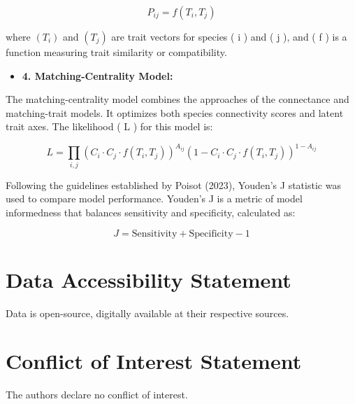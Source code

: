 \documentclass[
]{agujournal2019}
\providecommand{\tightlist}{%
  \setlength{\itemsep}{0pt}\setlength{\parskip}{0pt}}\usepackage{longtable,booktabs,array}
\begin{document}
\[
P_{ij} = f(T_i, T_j)
\]

where \(( T_i)\) and \(( T_j)\) are trait vectors for species ( i ) and
( j ), and ( f ) is a function measuring trait similarity or
compatibility.

\begin{itemize}
\tightlist
\item
  \textbf{4. Matching-Centrality Model:}
\end{itemize}

The matching-centrality model combines the approaches of the connectance
and matching-trait models. It optimizes both species connectivity scores
and latent trait axes. The likelihood ( L ) for this model is:

\[
L = \prod_{i,j} \left( C_i \cdot C_j \cdot f(T_i, T_j) \right)^{A_{ij}} \left( 1 - C_i \cdot C_j \cdot f(T_i, T_j) \right)^{1 - A_{ij}}
\]

Following the guidelines established by Poisot (2023), Youden's J
statistic was used to compare model performance. Youden's J is a metric
of model informedness that balances sensitivity and specificity,
calculated as:

\[
J = \text{Sensitivity} + \text{Specificity} - 1
\]

\section{Data Accessibility
Statement}\label{data-accessibility-statement}

Data is open-source, digitally available at their respective sources.

\section{Conflict of Interest
Statement}\label{conflict-of-interest-statement}

The authors declare no conflict of interest.
\end{document}
